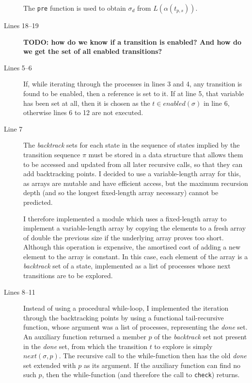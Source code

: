 \documentclass[12pt,a4paper,twoside,openright]{report}
\begin{document}
\begin{description}
	The \texttt{pre} function is used to
	obtain $\sigma_d$ from $L(\alpha(t_{p,s}))$.

	\item[Lines 18--19]	\textbf{TODO: how do we know if a transition
		is enabled? And how do we get the set of
		all enabled transitions?}

	\item[Lines 5--6] If, while iterating through the
	processes in lines 3 and 4, any transition is found to be
	enabled, then a reference is set to it. If at line 5,
	that variable has been set at all, then it is chosen
	as the $t \in \textit{enabled}(\sigma)$ in line 6,
	otherwise lines 6 to 12 are not executed.

	\item[Line 7] The \textit{backtrack} sets for each state
	in the sequence of states implied by the transition
	sequence $\pi$ must be stored in a data structure that
	allows them to be accessed and updated from all later
	recursive calls, so that they can add backtracking
	points. I decided to use a variable-length array
	for this, as arrays are mutable and have efficient
	access, but the maximum recursion depth (and so the
	longest fixed-length array necessary) cannot be predicted.
	
	I therefore implemented a module which uses a fixed-length
	array to implement a variable-length array by
	copying the elements to a fresh array of double the
	previous size if the underlying array proves too short.
	Although this operation is expensive, the amortised
	cost of adding a new element to the array is constant.
	In this case, each element of the array is a \textit{backtrack}
	set of a state, implemented as a list of processes
	whose next transitions are to be explored.
	
	\item[Lines 8--11] Instead of using a
	procedural while-loop,
	I implemented the iteration through
	the backtracking points
	by using a functional tail-recursive
	function, whose argument
	was a list of processes, representing
	the \textit{done} set. An auxiliary
	function returned a member $p$ of the
	\textit{backtrack} set not present in the
	\textit{done} set, from which the
	transition $t$ to explore is simply
	$\textit{next}(\sigma, p)$. The
	recursive call to the while-function
	then has the old \textit{done} set
	extended with $p$ as its argument. If
	the auxiliary function can
	find no such $p$, then the
	while-function (and therefore the
	call to \texttt{check}) returns.


\end{description}
\end{document}
